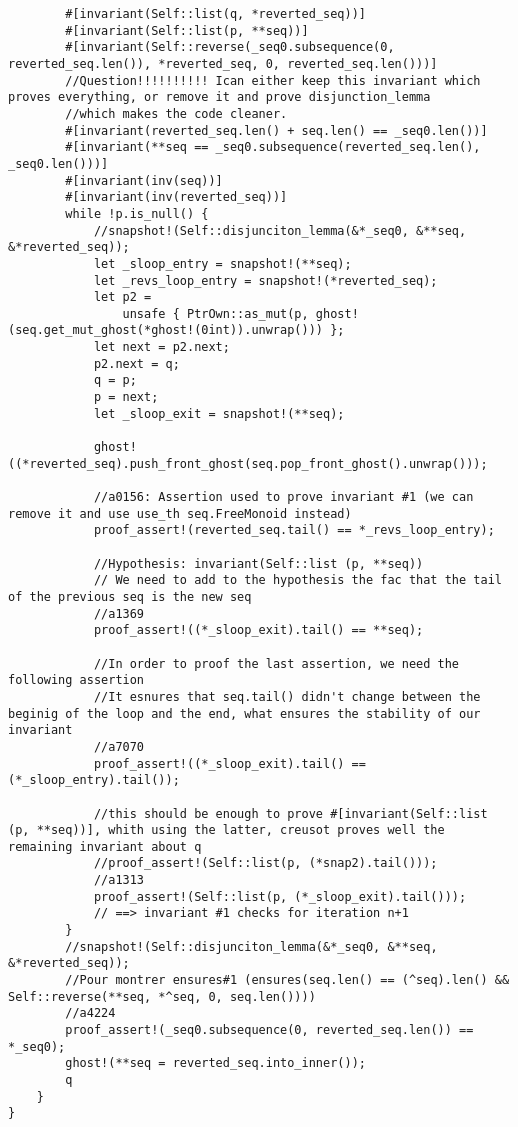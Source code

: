 \begin{verbatim}
        #[invariant(Self::list(q, *reverted_seq))]
        #[invariant(Self::list(p, **seq))]
        #[invariant(Self::reverse(_seq0.subsequence(0, reverted_seq.len()), *reverted_seq, 0, reverted_seq.len()))]
        //Question!!!!!!!!!! Ican either keep this invariant which proves everything, or remove it and prove disjunction_lemma
        //which makes the code cleaner.
        #[invariant(reverted_seq.len() + seq.len() == _seq0.len())]
        #[invariant(**seq == _seq0.subsequence(reverted_seq.len(), _seq0.len()))]
        #[invariant(inv(seq))]
        #[invariant(inv(reverted_seq))]
        while !p.is_null() {
            //snapshot!(Self::disjunciton_lemma(&*_seq0, &**seq, &*reverted_seq));
            let _sloop_entry = snapshot!(**seq);
            let _revs_loop_entry = snapshot!(*reverted_seq);
            let p2 =
                unsafe { PtrOwn::as_mut(p, ghost!(seq.get_mut_ghost(*ghost!(0int)).unwrap())) };
            let next = p2.next;
            p2.next = q;
            q = p;
            p = next;
            let _sloop_exit = snapshot!(**seq);

            ghost!((*reverted_seq).push_front_ghost(seq.pop_front_ghost().unwrap()));

            //a0156: Assertion used to prove invariant #1 (we can remove it and use use_th seq.FreeMonoid instead)
            proof_assert!(reverted_seq.tail() == *_revs_loop_entry);

            //Hypothesis: invariant(Self::list (p, **seq))
            // We need to add to the hypothesis the fac that the tail of the previous seq is the new seq
            //a1369
            proof_assert!((*_sloop_exit).tail() == **seq);

            //In order to proof the last assertion, we need the following assertion
            //It esnures that seq.tail() didn't change between the beginig of the loop and the end, what ensures the stability of our invariant
            //a7070
            proof_assert!((*_sloop_exit).tail() == (*_sloop_entry).tail());

            //this should be enough to prove #[invariant(Self::list (p, **seq))], whith using the latter, creusot proves well the remaining invariant about q
            //proof_assert!(Self::list(p, (*snap2).tail()));
            //a1313
            proof_assert!(Self::list(p, (*_sloop_exit).tail()));
            // ==> invariant #1 checks for iteration n+1
        }
        //snapshot!(Self::disjunciton_lemma(&*_seq0, &**seq, &*reverted_seq));
        //Pour montrer ensures#1 (ensures(seq.len() == (^seq).len() && Self::reverse(**seq, *^seq, 0, seq.len())))
        //a4224
        proof_assert!(_seq0.subsequence(0, reverted_seq.len()) == *_seq0);
        ghost!(**seq = reverted_seq.into_inner());
        q
    }
}


\end{verbatim}
